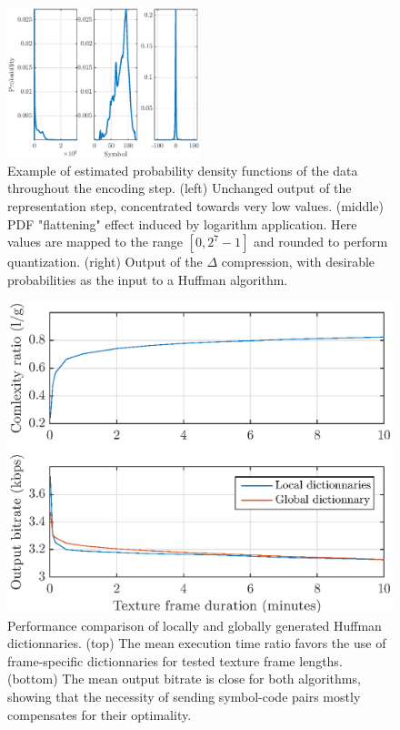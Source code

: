 \documentclass[final,3p,times,twocolumn]{elsarticle}
\begin{document}
\begin{figure}[htbp]
	\centering
		\includegraphics[width=0.5\textwidth]{figures/pdf.eps}
	\caption{Example of estimated probability density functions of the data throughout the encoding step. (left) Unchanged output of the representation step, concentrated towards very low values. (middle) PDF "flattening" effect induced by logarithm application. Here values are mapped to the range $[0, 2^7-1]$ and rounded to perform quantization. (right) Output of the $\Delta$ compression, with desirable probabilities as the input to a Huffman algorithm.}
	\label{fig:pdf}
\end{figure}

\begin{figure}[htbp]
	\centering
		\includegraphics[width=\columnwidth]{figures/dict_comp.eps}
	\caption{Performance comparison of locally and globally generated Huffman dictionnaries. (top) The mean execution time ratio favors the use of frame-specific dictionnaries for tested texture frame lengths. (bottom) The mean output bitrate is close for both algorithms, showing that the necessity of sending symbol-code pairs mostly compensates for their optimality.}
	\label{fig:dict_comp}
\end{figure}
\end{document}
